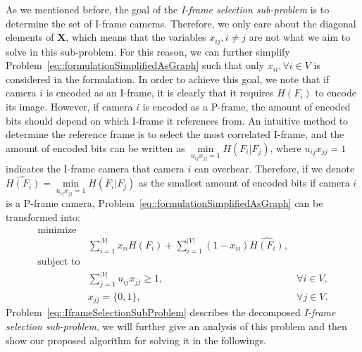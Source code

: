 As we mentioned before, the goal of the \emph{I-frame selection sub-problem} is to determine the set of I-frame cameras.
Therefore, we only care about the diagonal elements of $\mathbf{X}$, which means that the variables $x_{ij}, i \neq j$ are not what we aim to solve in this sub-problem.
For this reason, we can further simplify Problem~\eqref{eq::formulationSimplifiedAsGraph} such that only $x_{ii}, \forall i \in V$ is considered in the formulation.
In order to achieve this goal, we note that if camera $i$ is encoded as an I-frame, it is clearly that it requires $H(F_i)$ to encode its image.
However, if camera $i$ is encoded as a P-frame, the amount of encoded bits should depend on which I-frame it references from.
An intuitive method to determine the reference frame is to select the most correlated I-frame, and the amount of encoded bits can be written as $\underset{u_{ij}x_{jj} = 1}{\min} H(F_i|F_j)$, where $u_{ij}x_{jj} = 1$ indicates the I-frame camera that camera $i$ can overhear.
Therefore, if we denote ${\widehat{H(F_i)} = \underset{u_{ij}x_{jj} = 1}{\min} H(F_i|F_j)}$ as the smallest amount of encoded bits if camera $i$ is a P-frame camera, Problem~\eqref{eq::formulationSimplifiedAsGraph} can be transformed into:
\begin{align}
\text{minimize} & & \nonumber \\
	&\sum_{i=1}^{|V|} x_{ii}H(F_i) + \sum_{i=1}^{|V|} (1-x_{ii}) \widehat{H(F_i)}, & \nonumber \\
\text{subject to} & & \nonumber \\
	&\sum_{j=1}^{|V|} u_{ij} x_{jj} \geq 1, &\forall i \in V, \nonumber \\
	&x_{jj} = \{0,1\}, &\forall j \in V.  
\label{eq::IframeSelectionSubProblem}
\end{align}
Problem~\eqref{eq::IframeSelectionSubProblem} describes the decomposed \emph{I-frame selection sub-problem}, we will further give an analysis of this problem and then show our proposed algorithm for solving it in the followings.

%
